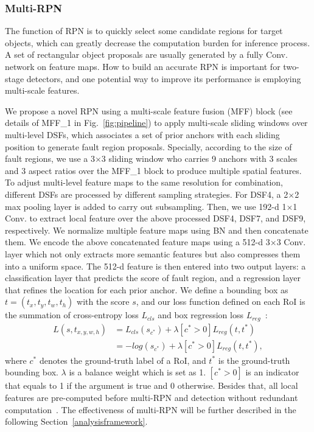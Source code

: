 \subsubsection{Multi-RPN}
\label{MRPN}
The function of RPN is to quickly select some candidate regions for target objects, which can greatly decrease the computation burden for inference process. A set of rectangular object proposals are usually generated by a fully Conv. network on feature maps. How to build an accurate RPN is important for two-stage detectors, and one potential way to improve its performance is employing multi-scale features.

We propose a novel RPN using a multi-scale feature fusion (MFF) block (see details of MFF\_1 in Fig.~\ref{fig:pipeline}) to apply multi-scale sliding windows over multi-level DSFs, which associates a set of prior anchors with each sliding position to generate fault region proposals. Specially, according to the size of fault regions, we use a 3$\times$3 sliding window who carries 9 anchors with 3 scales and 3 aspect ratios over the MFF\_1 block to produce multiple spatial features. To adjust multi-level feature maps to the same resolution for combination, different DSFs are processed by different sampling strategies. For DSF4, a 2$\times$2 max pooling layer is added to carry out subsampling. Then, we use 192-d 1$\times$1 Conv. to extract local feature over the above processed DSF4, DSF7, and DSF9, respectively. We normalize multiple feature maps using BN and then concatenate them. We encode the above concatenated feature maps using a 512-d 3$\times$3 Conv. layer which not only extracts more semantic features but also compresses them into a uniform space. The 512-d feature is then entered into two output layers: a classification layer that predicts the score of fault region, and a regression layer that refines the location for each prior anchor.
We define a bounding box as $t=(t_x,t_y,t_w,t_h)$ with the score $s$, and our loss function defined on each RoI is the summation of cross-entropy loss $L_{cls}$ and box regression loss $L_{reg}$~\cite{RenHGS15}:
\begin{equation}
\begin{split}
L(s,t_{x,y,w,h})&=L_{cls}(s_{c^*})+\lambda[c^*>0]L_{reg}(t,t^*) \\
&=-log(s_{c^*})+\lambda[c^*>0]L_{reg}(t,t^*),
\end{split}
\end{equation}
where $c^*$ denotes the ground-truth label of a RoI, and $t^*$ is the ground-truth bounding box. $\lambda$ is a balance weight which is set as 1. $[c^*>0]$ is an indicator that equals to 1 if the argument is true and 0 otherwise. Besides that, all local features are pre-computed before multi-RPN and detection without redundant computation~\cite{8911418}. The effectiveness of multi-RPN will be further described in the following Section~\ref{analysisframework}. %

